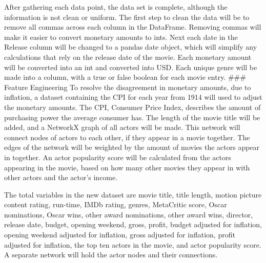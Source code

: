 \documentclass[11pt]{article}
\begin{document}
After gathering each data point, the data set is complete, although the
information is not clean or uniform. The first step to clean the data
will be to remove all commas across each column in the DataFrame.
Removing commas will make it easier to convert monetary amounts to ints.
Next each date in the Release column will be changed to a pandas date
object, which will simplify any calculations that rely on the release
date of the movie. Each monetary amount will be converted into an int
and converted into USD. Each unique genre will be made into a column,
with a true or false boolean for each movie entry. \#\#\# Feature
Engineering To resolve the disagreement in monetary amounts, due to
inflation, a dataset containing the CPI for each year from 1914 will
used to adjust the monetary amounts. The CPI, Consumer Price Index,
describes the amount of purchasing power the average consumer has. The
length of the movie title will be added, and a NetworkX graph of all
actors will be made. This network will connect nodes of actors to each
other, if they appear in a movie together. The edges of the network will
be weighted by the amount of movies the actors appear in together. An
actor popularity score will be calculated from the actors appearing in
the movie, based on how many other movies they appear in with other
actors and the actor's income.

The total variables in the new dataset are movie title, title length,
motion picture content rating, run-time, IMDb rating, genres, MetaCritic
score, Oscar nominations, Oscar wins, other award nominations, other
award wins, director, release date, budget, opening weekend, gross,
profit, budget adjusted for inflation, opening weekend adjusted for
inflation, gross adjusted for inflation, profit adjusted for inflation,
the top ten actors in the movie, and actor popularity score. A separate
network will hold the actor nodes and their connections.
\end{document}
